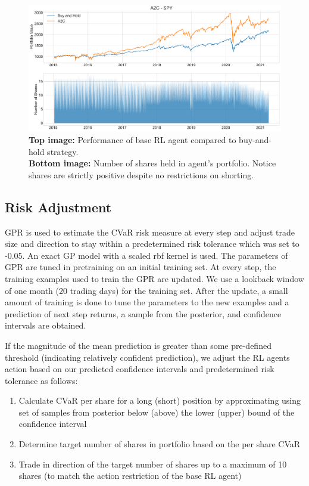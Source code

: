 \documentclass[12pt]{article}
\begin{document}
\begin{figure}[H]
	\centering
	\includegraphics[width=\linewidth]{../src/figures/rl_base_no_restrictions.pdf}
	\caption{\textbf{Top image:} Performance of base RL agent compared to buy-and-hold strategy. \\ \textbf{Bottom image:} Number of shares held in agent's portfolio. Notice shares are strictly positive despite no restrictions on shorting.}
	\label{fig:rl base}
\end{figure}

\subsection{Risk Adjustment}

GPR is used to estimate the CVaR risk measure at every step and adjust trade size and direction to stay within a predetermined risk tolerance which was set to -0.05. An exact GP model with a scaled rbf kernel is used. The parameters of GPR are tuned in pretraining on an initial training set. At every step, the training examples used to train the GPR are updated. We use a lookback window of one month (20 trading days) for the training set. After the update, a small amount of training is done to tune the parameters to the new examples and a prediction of next step returns, a sample from the posterior, and confidence intervals are obtained.

If the magnitude of the mean prediction is greater than some pre-defined threshold (indicating relatively confident prediction), we adjust the RL agents action based on our predicted confidence intervals and predetermined risk tolerance as follows:

\begin{enumerate}
	\item Calculate CVaR per share for a long (short) position by approximating using set of samples from posterior below (above) the lower (upper) bound of the confidence interval
	\item Determine target number of shares in portfolio based on the per share CVaR
	\item Trade in direction of the target number of shares up to a maximum of 10 shares (to match the action restriction of the base RL agent)
\end{enumerate}
\end{document}
